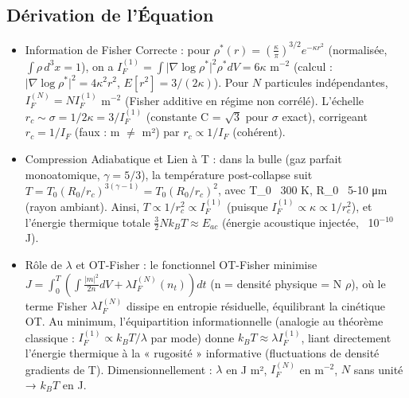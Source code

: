 \documentclass[a4paper,12pt]{article}
\begin{document}
\subsection{Dérivation de l'Équation}
\begin{itemize}
    \item Information de Fisher Correcte : pour \( \rho^*(r) = \left( \frac{\kappa}{\pi} \right)^{3/2} e^{-\kappa r^2} \) (normalisée, \(\int \rho \, d^3 x = 1\)), on a \( I_F^{(1)} = \int \vert \nabla \log \rho^* \vert^2 \rho^* dV = 6 \kappa \) m\(^{-2}\) (calcul : \( \vert \nabla \log \rho^* \vert^2 = 4 \kappa^2 r^2 \), \( E[r^2] = 3/(2 \kappa) \)). Pour \( N \) particules indépendantes, \( I_F^{(N)} = N I_F^{(1)} \) m\(^{-2}\) (Fisher additive en régime non corrélé). L'échelle \( r_c \sim \sigma = 1 / 2 \kappa = 3 / I_F^{(1)} \) (constante C = \(\sqrt{3}\) pour \(\sigma\) exact), corrigeant \( r_c = 1 / I_F \) (faux : m \(\neq\) m²) par \( r_c \propto 1 / I_F \) (cohérent).
    \item Compression Adiabatique et Lien à T : dans la bulle (gaz parfait monoatomique, \(\gamma = 5/3\)), la température post-collapse suit \( T = T_0 (R_0 / r_c)^{3(\gamma-1)} = T_0 (R_0 / r_c)^2 \), avec T_0 ~300 K, R_0 ~5-10 μm (rayon ambiant). Ainsi, \( T \propto 1 / r_c^2 \propto I_F^{(1)} \) (puisque \( I_F^{(1)} \propto \kappa \propto 1 / r_c^2 \)), et l'énergie thermique totale \( \frac{3}{2} N k_B T \approx E_{ac} \) (énergie acoustique injectée, ~10\(^{-10}\) J).
    \item Rôle de \(\lambda\) et OT-Fisher : le fonctionnel OT-Fisher minimise \( J = \int_0^T \left( \int \frac{\vert m \vert^2}{2 n} dV + \lambda I_F^{(N)}(n_t) \right) dt \) (n = densité physique = N \(\rho\)), où le terme Fisher \( \lambda I_F^{(N)} \) dissipe en entropie résiduelle, équilibrant la cinétique OT. Au minimum, l'équipartition informationnelle (analogie au théorème classique : \( I_F^{(1)} \propto k_B T / \lambda \) par mode) donne \( k_B T \approx \lambda I_F^{(1)} \), liant directement l'énergie thermique à la « rugosité » informative (fluctuations de densité ~ gradients de T). Dimensionnellement : \(\lambda\) en J m², \(I_F^{(N)}\) en m\(^{-2}\), \(N\) sans unité → \(k_B T\) en J.
\end{itemize}
\end{document}
